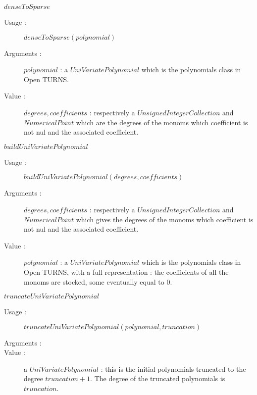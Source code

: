 \begin{description}


  \item $denseToSparse$
    \begin{description}
    \item[Usage :] $denseToSparse(polynomial)$
    \item[Arguments :] $polynomial$ : a $UniVariatePolynomial$ which is the polynomials class in Open TURNS.
    \item[Value :]  $degrees, coefficients$ : respectively a $UnsignedIntegerCollection$ and $NumericalPoint$ which are the degrees of the monoms which coefficient is not nul and the associated coefficient.
    \end{description}
    \bigskip


  \item $buildUniVariatePolynomial$
    \begin{description}
    \item[Usage :] $buildUniVariatePolynomial(degrees, coefficients)$
    \item[Arguments :] $degrees, coefficients$ : respectively a $UnsignedIntegerCollection$ and $NumericalPoint$ which gives the degrees of the monoms which coefficient is not nul and the associated coefficient.
    \item[Value :]  $polynomial$ : a $UniVariatePolynomial$ which is the polynomials class in Open TURNS, with a full representation : the coefficients of all the monoms are stocked, some eventually equal to 0.
    \end{description}
    \bigskip


  \item $truncateUniVariatePolynomial$
    \begin{description}
    \item[Usage :] $truncateUniVariatePolynomial(polynomial, truncation)$
    \item[Arguments :]  \strut
    \item[Value :]  a $UniVariatePolynomial$ : this is the initial polynomials truncated to the degree $truncation+1$. The degree of the truncated polynomials is $truncation$.
    \end{description}

 
\end{description}



